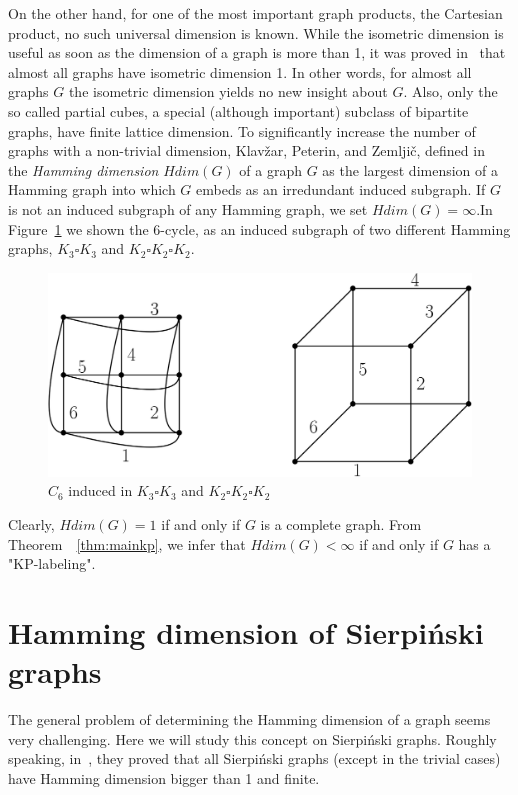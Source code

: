 \documentclass[12pt,a4paper,titlepage,openany]{report}
\begin{document}
 On the other hand, for one of the most important graph products, the Cartesian product, no such universal dimension is known. While the isometric dimension is useful as soon as the dimension of a graph is more than 1, it was proved in~\cite{Poljak} that almost all graphs have isometric dimension 1. In other words, for almost all graphs $G$ the isometric dimension yields no new insight about $G$. Also, only the so called partial cubes, a special (although important) subclass of bipartite graphs, have finite lattice dimension.\newline
\newline
To significantly increase the number of graphs with a non-trivial dimension, Klav\v zar, Peterin, and Zemlji\v c, defined in~\cite{Sandi} the \textit{Hamming dimension} $Hdim(G )$ of a graph $G$ as the largest dimension of a Hamming graph into which $G$ embeds as an irredundant induced subgraph. If $G$ is not an induced subgraph of any Hamming graph, we set $Hdim ( G ) = \infty$.\newline In Figure~\ref{fig:c6hdim} we shown the 6-cycle, as an induced subgraph of two different Hamming graphs, $K_3\square K_3$ and $K_2\square K_2\square K_2$.
\begin{figure}[h]
\begin{center}
\includegraphics[width=1\linewidth]{figures/c_6hdim.png}
\end{center}
\caption{$C_6$ induced in $K_3\square K_3$ and $K_2\square K_2\square K_2$}\label{fig:c6hdim}
\end{figure}
Clearly, $Hdim ( G ) = 1$ if and only if $G$ is a complete graph. From Theorem~~\ref{thm:mainkp}, we infer that $Hdim ( G ) <\infty$ if and only if $G$ has a "KP-labeling".
\section{Hamming dimension of Sierpi\' nski graphs}
The general problem of determining the Hamming dimension of a graph seems very challenging. Here we will study this concept on Sierpi\' nski graphs. Roughly speaking, in~\cite{Sandi}, they proved that all Sierpi\'nski graphs (except in the trivial cases) have Hamming dimension bigger than 1 and finite. 
\end{document}
